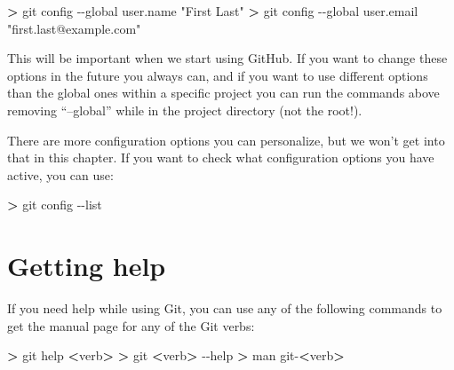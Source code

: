 \documentclass[
]{book}
\newenvironment{Shaded}{\begin{snugshade}}{\end{snugshade}}
\newcommand{\AttributeTok}[1]{\textcolor[rgb]{0.13,0.29,0.53}{#1}}
\newcommand{\BuiltInTok}[1]{#1}
\newcommand{\ExtensionTok}[1]{#1}
\newcommand{\NormalTok}[1]{#1}
\newcommand{\OperatorTok}[1]{\textcolor[rgb]{0.81,0.36,0.00}{\textbf{#1}}}
\newcommand{\StringTok}[1]{\textcolor[rgb]{0.31,0.60,0.02}{#1}}
\begin{document}
\begin{Shaded}
\begin{Highlighting}[]
\OperatorTok{\textgreater{}}\NormalTok{ git }\ExtensionTok{config} \AttributeTok{{-}{-}global}\NormalTok{ user.name }\StringTok{"First Last"}
\OperatorTok{\textgreater{}}\NormalTok{ git }\ExtensionTok{config} \AttributeTok{{-}{-}global}\NormalTok{ user.email }\StringTok{"first.last@example.com"}
\end{Highlighting}
\end{Shaded}

This will be important when we start using GitHub. If you want to change these options in the future you always can, and if you want to use different options than the global ones within a specific project you can run the commands above removing ``--global'' while in the project directory (not the root!).

There are more configuration options you can personalize, but we won't get into that in this chapter. If you want to check what configuration options you have active, you can use:

\begin{Shaded}
\begin{Highlighting}[]
\OperatorTok{\textgreater{}}\NormalTok{ git }\ExtensionTok{config} \AttributeTok{{-}{-}list}
\end{Highlighting}
\end{Shaded}

\hypertarget{getting-help}{%
\section{Getting help}\label{getting-help}}

If you need help while using Git, you can use any of the following commands to get the manual page for any of the Git verbs:

\begin{Shaded}
\begin{Highlighting}[]
\OperatorTok{\textgreater{}}\NormalTok{ git }\BuiltInTok{help} \OperatorTok{\textless{}}\NormalTok{verb}\OperatorTok{\textgreater{}}
\OperatorTok{\textgreater{}}\NormalTok{ git }\OperatorTok{\textless{}}\NormalTok{verb}\OperatorTok{\textgreater{}}\NormalTok{ {-}{-}help}
\OperatorTok{\textgreater{}}\NormalTok{ man }\ExtensionTok{git{-}}\OperatorTok{\textless{}}\NormalTok{verb}\OperatorTok{\textgreater{}}
\end{Highlighting}
\end{Shaded}
\end{document}
